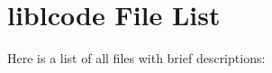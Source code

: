 \section{liblcode File List}
Here is a list of all files with brief descriptions:\begin{CompactList}
\item{}
\end{CompactList}
